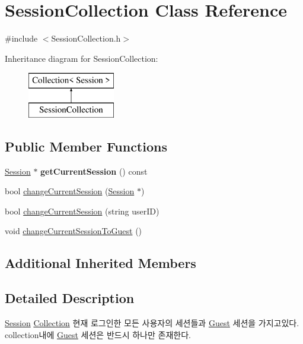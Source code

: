 \hypertarget{class_session_collection}{}\section{Session\+Collection Class Reference}
\label{class_session_collection}


{\ttfamily \#include $<$Session\+Collection.\+h$>$}

Inheritance diagram for Session\+Collection\+:\begin{figure}[H]
\begin{center}
\leavevmode
\includegraphics[height=2.000000cm]{class_session_collection}
\end{center}
\end{figure}
\subsection*{Public Member Functions}
\begin{DoxyCompactItemize}
\item 
\mbox{\label{class_session_collection_a57ca0e2003ebc212dc0179c80201b3d1}} 
\mbox{\hyperlink{class_session}{Session}} $\ast$ {\bfseries get\+Current\+Session} () const
\item 
bool \mbox{\hyperlink{class_session_collection_a52b76b5e700a4b3395784bbe56ccd1c4}{change\+Current\+Session}} (\mbox{\hyperlink{class_session}{Session}} $\ast$)
\item 
bool \mbox{\hyperlink{class_session_collection_a516c5d275d9adc47040c5acbe1e47372}{change\+Current\+Session}} (string user\+ID)
\item 
void \mbox{\hyperlink{class_session_collection_ada1aab5737803b2f9b11d91c412d8047}{change\+Current\+Session\+To\+Guest}} ()
\end{DoxyCompactItemize}
\subsection*{Additional Inherited Members}


\subsection{Detailed Description}
\mbox{\hyperlink{class_session}{Session}} \mbox{\hyperlink{class_collection}{Collection}} 현재 로그인한 모든 사용자의 세션들과 \mbox{\hyperlink{class_guest}{Guest}} 세션을 가지고있다. collection내에 \mbox{\hyperlink{class_guest}{Guest}} 세션은 반드시 하나만 존재한다. 


